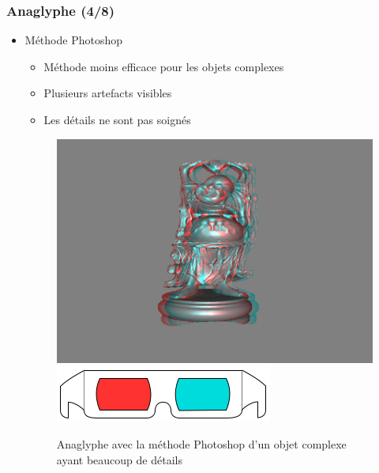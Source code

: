 \documentclass{beamer}
\begin{document}
%
\begin{frame}
\frametitle{Anaglyphe (4/8)}
\begin{itemize}[label=$\bullet$]
\item Méthode Photoshop \cite{stereoAnaglyph}
	\begin{itemize}[label=$\circ$]
	\item Méthode moins efficace pour les objets complexes 
	\item Plusieurs artefacts visibles
	\item Les détails ne sont pas soignés
	\end{itemize}
\begin{figure}
\centering
\includegraphics[scale=0.3]{happy_photoshop.png}
\includegraphics[scale=0.2]{lunettes.png}
\caption{Anaglyphe avec la méthode Photoshop d'un objet complexe ayant beaucoup de détails }
\end{figure}
	
\end{itemize}

\end{frame}
\end{document}
